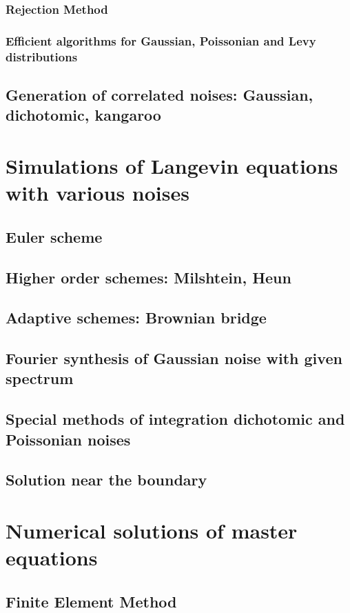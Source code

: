 \documentclass[authoryear,draft,1p,times]{elsarticle}
\renewcommand{\=}{\stackrel{\mathrm{d}}{=}}
\begin{document}
\subsubsection{Rejection Method}
\subsubsection{Efficient algorithms for Gaussian, Poissonian and Levy distributions}
\subsection{Generation of  correlated noises:  Gaussian, dichotomic, kangaroo}
\newpage

\section{ Simulations of Langevin equations with various noises}

\subsection{Euler scheme}
\subsection{Higher order schemes: Milshtein, Heun}
\subsection{Adaptive schemes: Brownian bridge}
\subsection{Fourier synthesis of  Gaussian noise with given spectrum}
\subsection{Special methods of integration dichotomic and Poissonian noises}
\subsection{Solution near the boundary}

\section{Numerical  solutions  of master equations} 

\subsection{Finite Element Method}
\end{document}
